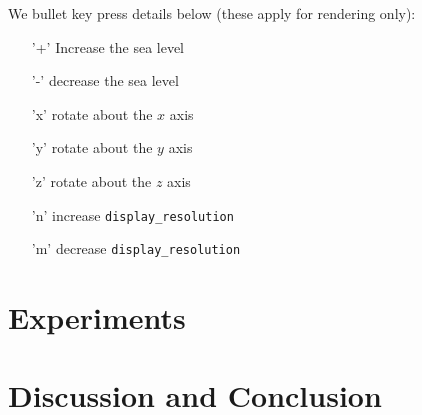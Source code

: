\documentclass[]{scrartcl}
\begin{document}
\indent We bullet key press details below (these apply for rendering only):
\begin{enumerate}
\item['+'] Increase the sea level
\item['-'] decrease the sea level
\item['x'] rotate about the $x$ axis
\item['y'] rotate about the $y$ axis
\item['z'] rotate about the $z$ axis
\item['n'] increase \texttt{display\_resolution}
\item['m'] decrease \texttt{display\_resolution}
\end{enumerate}

\section{Experiments}

\section{Discussion and Conclusion}
\end{document}
